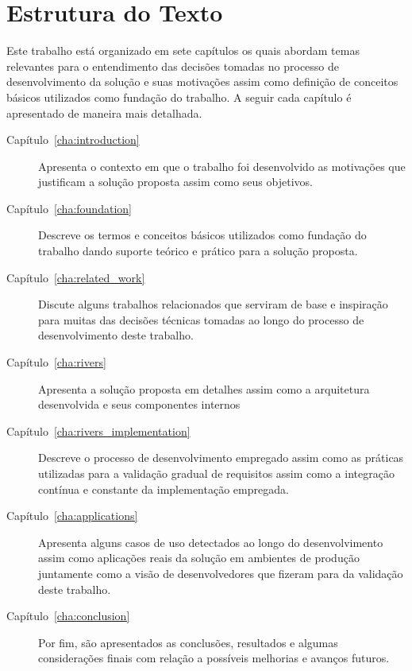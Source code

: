 \section{Estrutura do Texto}
\label{sec:text_structure}

Este trabalho está organizado em sete capítulos os quais abordam temas relevantes para o entendimento das decisões tomadas no processo de desenvolvimento da solução e suas motivações assim como definição de conceitos básicos utilizados como fundação do trabalho. A seguir cada capítulo é apresentado de maneira mais detalhada.

\begin{description}
    \item [Capítulo~\ref{cha:introduction}] Apresenta o contexto em que o trabalho foi desenvolvido as motivações que justificam a solução proposta assim como seus objetivos.
    \item [Capítulo~\ref{cha:foundation}] Descreve os termos e conceitos básicos utilizados como fundação do trabalho dando suporte teórico e prático para a solução proposta.
    \item [Capítulo~\ref{cha:related_work}] Discute alguns trabalhos relacionados que serviram de base e inspiração para muitas das decisões técnicas tomadas ao longo do processo de desenvolvimento deste trabalho.
    \item [Capítulo~\ref{cha:rivers}] Apresenta a solução proposta em detalhes assim como a arquitetura desenvolvida e seus componentes internos
    \item [Capítulo~\ref{cha:rivers_implementation}] Descreve o processo de desenvolvimento empregado assim como as práticas utilizadas para a validação gradual de requisitos assim como a integração contínua e constante da implementação empregada.
    \item [Capítulo~\ref{cha:applications}] Apresenta alguns casos de uso detectados ao longo do desenvolvimento assim como aplicações reais da solução em ambientes de produção juntamente como a visão de desenvolvedores que fizeram para da validação deste trabalho.
    \item [Capítulo~\ref{cha:conclusion}] Por fim, são apresentados as conclusões, resultados e algumas considerações finais com relação a possíveis melhorias e avanços futuros.
\end{description}